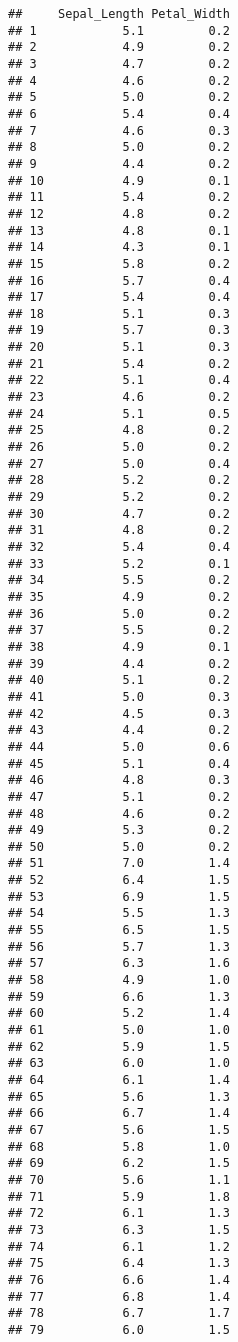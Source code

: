 \documentclass[
]{article}
\begin{document}
\begin{verbatim}
##     Sepal_Length Petal_Width
## 1            5.1         0.2
## 2            4.9         0.2
## 3            4.7         0.2
## 4            4.6         0.2
## 5            5.0         0.2
## 6            5.4         0.4
## 7            4.6         0.3
## 8            5.0         0.2
## 9            4.4         0.2
## 10           4.9         0.1
## 11           5.4         0.2
## 12           4.8         0.2
## 13           4.8         0.1
## 14           4.3         0.1
## 15           5.8         0.2
## 16           5.7         0.4
## 17           5.4         0.4
## 18           5.1         0.3
## 19           5.7         0.3
## 20           5.1         0.3
## 21           5.4         0.2
## 22           5.1         0.4
## 23           4.6         0.2
## 24           5.1         0.5
## 25           4.8         0.2
## 26           5.0         0.2
## 27           5.0         0.4
## 28           5.2         0.2
## 29           5.2         0.2
## 30           4.7         0.2
## 31           4.8         0.2
## 32           5.4         0.4
## 33           5.2         0.1
## 34           5.5         0.2
## 35           4.9         0.2
## 36           5.0         0.2
## 37           5.5         0.2
## 38           4.9         0.1
## 39           4.4         0.2
## 40           5.1         0.2
## 41           5.0         0.3
## 42           4.5         0.3
## 43           4.4         0.2
## 44           5.0         0.6
## 45           5.1         0.4
## 46           4.8         0.3
## 47           5.1         0.2
## 48           4.6         0.2
## 49           5.3         0.2
## 50           5.0         0.2
## 51           7.0         1.4
## 52           6.4         1.5
## 53           6.9         1.5
## 54           5.5         1.3
## 55           6.5         1.5
## 56           5.7         1.3
## 57           6.3         1.6
## 58           4.9         1.0
## 59           6.6         1.3
## 60           5.2         1.4
## 61           5.0         1.0
## 62           5.9         1.5
## 63           6.0         1.0
## 64           6.1         1.4
## 65           5.6         1.3
## 66           6.7         1.4
## 67           5.6         1.5
## 68           5.8         1.0
## 69           6.2         1.5
## 70           5.6         1.1
## 71           5.9         1.8
## 72           6.1         1.3
## 73           6.3         1.5
## 74           6.1         1.2
## 75           6.4         1.3
## 76           6.6         1.4
## 77           6.8         1.4
## 78           6.7         1.7
## 79           6.0         1.5

\end{verbatim}
\end{document}
